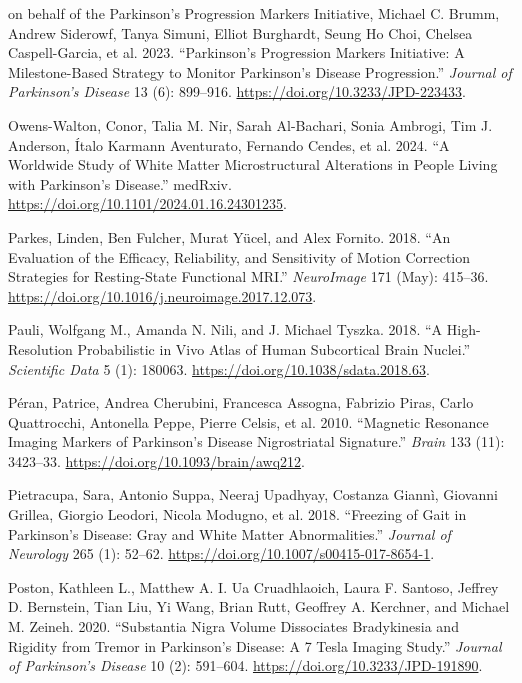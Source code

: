 \documentclass[
  table]{article}
\newlength{\cslhangindent}
\newenvironment{CSLReferences}[2] %
 {\begin{list}{}{%
  \setlength{\itemindent}{0pt}
  \setlength{\leftmargin}{0pt}
  \setlength{\parsep}{0pt}
  \ifodd #1
   \setlength{\leftmargin}{\cslhangindent}
   \setlength{\itemindent}{-1\cslhangindent}
  \fi
  \setlength{\itemsep}{#2\baselineskip}}}
 {\end{list}}
\begin{document}
\begin{CSLReferences}{1}{0}
on behalf of the Parkinson's Progression Markers Initiative, Michael C.
Brumm, Andrew Siderowf, Tanya Simuni, Elliot Burghardt, Seung Ho Choi,
Chelsea Caspell-Garcia, et al. 2023. {``Parkinson{'}s {Progression}
{Markers} {Initiative}: {A} {Milestone}-{Based} {Strategy} to {Monitor}
{Parkinson}{'}s {Disease} {Progression}.''} \emph{Journal of Parkinson's
Disease} 13 (6): 899--916. \url{https://doi.org/10.3233/JPD-223433}.

Owens-Walton, Conor, Talia M. Nir, Sarah Al-Bachari, Sonia Ambrogi, Tim
J. Anderson, Ítalo Karmann Aventurato, Fernando Cendes, et al. 2024.
{``A {Worldwide} {Study} of {White} {Matter} {Microstructural}
{Alterations} in {People} {Living} with {Parkinson}{'}s {Disease}.''}
medRxiv. \url{https://doi.org/10.1101/2024.01.16.24301235}.

Parkes, Linden, Ben Fulcher, Murat Yücel, and Alex Fornito. 2018. {``An
Evaluation of the Efficacy, Reliability, and Sensitivity of Motion
Correction Strategies for Resting-State Functional {MRI}.''}
\emph{NeuroImage} 171 (May): 415--36.
\url{https://doi.org/10.1016/j.neuroimage.2017.12.073}.

Pauli, Wolfgang M., Amanda N. Nili, and J. Michael Tyszka. 2018. {``A
High-Resolution Probabilistic in Vivo Atlas of Human Subcortical Brain
Nuclei.''} \emph{Scientific Data} 5 (1): 180063.
\url{https://doi.org/10.1038/sdata.2018.63}.

Péran, Patrice, Andrea Cherubini, Francesca Assogna, Fabrizio Piras,
Carlo Quattrocchi, Antonella Peppe, Pierre Celsis, et al. 2010.
{``Magnetic Resonance Imaging Markers of {Parkinson}{'}s Disease
Nigrostriatal Signature.''} \emph{Brain} 133 (11): 3423--33.
\url{https://doi.org/10.1093/brain/awq212}.

Pietracupa, Sara, Antonio Suppa, Neeraj Upadhyay, Costanza Giannì,
Giovanni Grillea, Giorgio Leodori, Nicola Modugno, et al. 2018.
{``Freezing of Gait in {Parkinson}{'}s Disease: Gray and White Matter
Abnormalities.''} \emph{Journal of Neurology} 265 (1): 52--62.
\url{https://doi.org/10.1007/s00415-017-8654-1}.

Poston, Kathleen L., Matthew A. I. Ua Cruadhlaoich, Laura F. Santoso,
Jeffrey D. Bernstein, Tian Liu, Yi Wang, Brian Rutt, Geoffrey A.
Kerchner, and Michael M. Zeineh. 2020. {``Substantia {Nigra} {Volume}
{Dissociates} {Bradykinesia} and {Rigidity} from {Tremor} in
{Parkinson}{'}s {Disease}: {A} 7 {Tesla} {Imaging} {Study}.''}
\emph{Journal of Parkinson's Disease} 10 (2): 591--604.
\url{https://doi.org/10.3233/JPD-191890}.


\end{CSLReferences}
\end{document}
